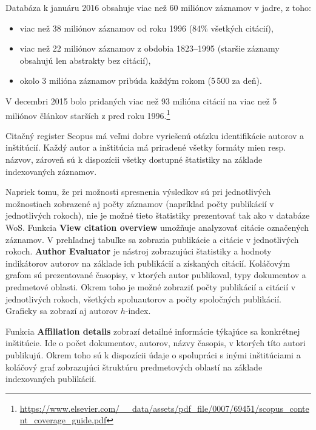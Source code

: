 Databáza k januáru 2016 obsahuje viac než 60 miliónov záznamov v jadre, z toho:

\begin{itemize}

\item viac než 38 miliónov záznamov od roku 1996 (84\% všetkých citácií),

\item viac než 22 miliónov záznamov z obdobia 1823--1995 (staršie záznamy
  obsahujú len abstrakty bez citácií),

\item okolo 3 milióna záznamov pribúda každým rokom (5\,500 za deň).

\end{itemize}

V decembri 2015 bolo pridaných viac než 93 milióna citácií na viac než 5
miliónov článkov starších z pred roku
1996.\footnote{\url{https://www.elsevier.com/__data/assets/pdf_file/0007/69451/scopus_content_coverage_guide.pdf}}

Citačný register Scopus má veľmi dobre vyriešenú otázku identifikácie autorov a
inštitúcií. Každý autor a inštitúcia má priradené všetky formáty mien
resp. názvov, zároveň sú k dispozícii všetky dostupné štatistiky na základe
indexovaných záznamov.

Napriek tomu, že pri možnosti spresnenia výsledkov sú pri jednotlivých
možnostiach zobrazené aj počty záznamov (napríklad počty publikácií v
jednotlivých rokoch), nie je možné tieto štatistiky prezentovať tak ako v
databáze WoS. Funkcia \textbf{View citation overview} umožňuje analyzovať
citácie označených záznamov. V prehľadnej tabuľke sa zobrazia publikácie a
citácie v jednotlivých rokoch. \textbf{Author Evaluator} je nástroj zobrazujúci
štatistiky a hodnoty indikátorov autorov na základe ich publikácií a získaných
citácií. Koláčovým grafom sú prezentované časopisy, v ktorých autor publikoval,
typy dokumentov a predmetové oblasti. Okrem toho je možné zobraziť počty
publikácií a citácií v jednotlivých rokoch, všetkých spoluautorov a počty
spoločných publikácií. Graficky sa zobrazí aj autorov $h$-index.

Funkcia \textbf{Affiliation details} zobrazí detailné informácie týkajúce sa konkrétnej
inštitúcie. Ide o počet dokumentov, autorov, názvy časopis, v ktorých títo
autori publikujú. Okrem toho sú k dispozícii údaje o spolupráci s inými
inštitúciami a koláčový graf zobrazujúci štruktúru predmetových oblastí na
základe indexovaných publikácií.

